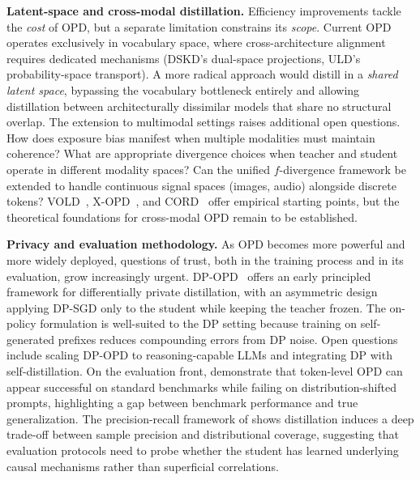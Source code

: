 \documentclass{article} %
\begin{document}
\textbf{Latent-space and cross-modal distillation.} Efficiency improvements tackle the \emph{cost} of OPD, but a separate limitation constrains its \emph{scope}. Current OPD operates exclusively in vocabulary space, where cross-architecture alignment requires dedicated mechanisms (DSKD's dual-space projections, ULD's probability-space transport). A more radical approach would distill in a \emph{shared latent space}, bypassing the vocabulary bottleneck entirely and allowing distillation between architecturally dissimilar models that share no structural overlap. The extension to multimodal settings raises additional open questions. How does exposure bias manifest when multiple modalities must maintain coherence? What are appropriate divergence choices when teacher and student operate in different modality spaces? Can the unified $f$-divergence framework be extended to handle continuous signal spaces (images, audio) alongside discrete tokens? VOLD~\citep{2510.23497}, X-OPD~\citep{2603.24596}, and CORD~\citep{hu2026cord} offer empirical starting points, but the theoretical foundations for cross-modal OPD remain to be established.

\textbf{Privacy and evaluation methodology.} As OPD becomes more powerful and more widely deployed, questions of trust, both in the training process and in its evaluation, grow increasingly urgent. DP-OPD~\citep{khadem2026dpopd} offers an early principled framework for differentially private distillation, with an asymmetric design applying DP-SGD only to the student while keeping the teacher frozen. The on-policy formulation is well-suited to the DP setting because training on self-generated prefixes reduces compounding errors from DP noise. Open questions include scaling DP-OPD to reasoning-capable LLMs and integrating DP with self-distillation. On the evaluation front, \citet{2603.25562} demonstrate that token-level OPD can appear successful on standard benchmarks while failing on distribution-shifted prompts, highlighting a gap between benchmark performance and true generalization. The precision-recall framework of \citet{2505.13111} shows distillation induces a deep trade-off between sample precision and distributional coverage, suggesting that evaluation protocols need to probe whether the student has learned underlying causal mechanisms rather than superficial correlations.
\end{document}
